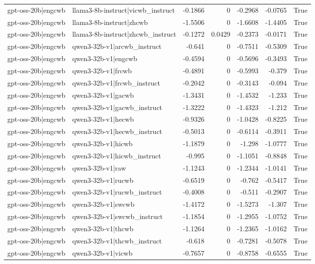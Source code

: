 \begin{table}
\begin{tabular}{l l r r r r l}
gpt-oss-20b|engcwb & llama3-8b-instruct|vicwb_instruct & -0.1866 & 0 & -0.2968 & -0.0765 & True \\
gpt-oss-20b|engcwb & llama3-8b-instruct|zhcwb & -1.5506 & 0 & -1.6608 & -1.4405 & True \\
gpt-oss-20b|engcwb & llama3-8b-instruct|zhcwb_instruct & -0.1272 & 0.0429 & -0.2373 & -0.0171 & True \\
gpt-oss-20b|engcwb & qwen3-32b-v1|arcwb_instruct & -0.641 & 0 & -0.7511 & -0.5309 & True \\
gpt-oss-20b|engcwb & qwen3-32b-v1|engcwb & -0.4594 & 0 & -0.5696 & -0.3493 & True \\
gpt-oss-20b|engcwb & qwen3-32b-v1|frcwb & -0.4891 & 0 & -0.5993 & -0.379 & True \\
gpt-oss-20b|engcwb & qwen3-32b-v1|frcwb_instruct & -0.2042 & 0 & -0.3143 & -0.094 & True \\
gpt-oss-20b|engcwb & qwen3-32b-v1|gacwb & -1.3431 & 0 & -1.4532 & -1.233 & True \\
gpt-oss-20b|engcwb & qwen3-32b-v1|gacwb_instruct & -1.3222 & 0 & -1.4323 & -1.212 & True \\
gpt-oss-20b|engcwb & qwen3-32b-v1|hecwb & -0.9326 & 0 & -1.0428 & -0.8225 & True \\
gpt-oss-20b|engcwb & qwen3-32b-v1|hecwb_instruct & -0.5013 & 0 & -0.6114 & -0.3911 & True \\
gpt-oss-20b|engcwb & qwen3-32b-v1|hicwb & -1.1879 & 0 & -1.298 & -1.0777 & True \\
gpt-oss-20b|engcwb & qwen3-32b-v1|hicwb_instruct & -0.995 & 0 & -1.1051 & -0.8848 & True \\
gpt-oss-20b|engcwb & qwen3-32b-v1|raw & -1.1243 & 0 & -1.2344 & -1.0141 & True \\
gpt-oss-20b|engcwb & qwen3-32b-v1|rucwb & -0.6519 & 0 & -0.762 & -0.5417 & True \\
gpt-oss-20b|engcwb & qwen3-32b-v1|rucwb_instruct & -0.4008 & 0 & -0.511 & -0.2907 & True \\
gpt-oss-20b|engcwb & qwen3-32b-v1|swcwb & -1.4172 & 0 & -1.5273 & -1.307 & True \\
gpt-oss-20b|engcwb & qwen3-32b-v1|swcwb_instruct & -1.1854 & 0 & -1.2955 & -1.0752 & True \\
gpt-oss-20b|engcwb & qwen3-32b-v1|thcwb & -1.1264 & 0 & -1.2365 & -1.0162 & True \\
gpt-oss-20b|engcwb & qwen3-32b-v1|thcwb_instruct & -0.618 & 0 & -0.7281 & -0.5078 & True \\
gpt-oss-20b|engcwb & qwen3-32b-v1|vicwb & -0.7657 & 0 & -0.8758 & -0.6555 & True \\

\end{tabular}
\end{table}
